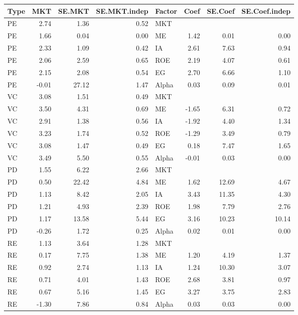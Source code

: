 \documentclass[12pt]{article}
\begin{document}
\begin{table}[ht]
	\centering
	\begin{tabular}{lrrrlrrr}
		\hline
		Type & MKT & SE.MKT & SE.MKT.indep & Factor & Coef & SE.Coef & SE.Coef.indep \\ 
		\hline
		PE & 2.74 & 1.36 & 0.52 & MKT &  &  &  \\ 
		PE & 1.66 & 0.04 & 0.00 & ME & 1.42 & 0.01 & 0.00 \\ 
		PE & 2.33 & 1.09 & 0.42 & IA & 2.61 & 7.63 & 0.94 \\ 
		PE & 2.06 & 2.59 & 0.65 & ROE & 2.19 & 4.07 & 0.61 \\ 
		PE & 2.15 & 2.08 & 0.54 & EG & 2.70 & 6.66 & 1.10 \\ 
		PE & -0.01 & 27.12 & 1.47 & Alpha & 0.03 & 0.09 & 0.01 \\ 
		VC & 3.08 & 1.51 & 0.49 & MKT &  &  &  \\ 
		VC & 3.50 & 4.31 & 0.69 & ME & -1.65 & 6.31 & 0.72 \\ 
		VC & 2.91 & 1.38 & 0.56 & IA & -1.92 & 4.40 & 1.34 \\ 
		VC & 3.23 & 1.74 & 0.52 & ROE & -1.29 & 3.49 & 0.79 \\ 
		VC & 3.08 & 1.47 & 0.49 & EG & 0.18 & 7.47 & 1.65 \\ 
		VC & 3.49 & 5.50 & 0.55 & Alpha & -0.01 & 0.03 & 0.00 \\ 
		PD & 1.55 & 6.22 & 2.66 & MKT &  &  &  \\ 
		PD & 0.50 & 22.42 & 4.84 & ME & 1.62 & 12.69 & 4.67 \\ 
		PD & 1.13 & 8.42 & 2.05 & IA & 3.43 & 11.35 & 4.30 \\ 
		PD & 1.21 & 4.93 & 2.39 & ROE & 1.98 & 7.79 & 2.76 \\ 
		PD & 1.17 & 13.58 & 5.44 & EG & 3.16 & 10.23 & 10.14 \\ 
		PD & -0.26 & 1.72 & 0.25 & Alpha & 0.02 & 0.01 & 0.00 \\ 
		RE & 1.13 & 3.64 & 1.28 & MKT &  &  &  \\ 
		RE & 0.17 & 7.75 & 1.38 & ME & 1.20 & 4.19 & 1.37 \\ 
		RE & 0.92 & 2.74 & 1.13 & IA & 1.24 & 10.30 & 3.07 \\ 
		RE & 0.71 & 4.01 & 1.43 & ROE & 2.68 & 3.81 & 0.97 \\ 
		RE & 0.67 & 5.16 & 1.45 & EG & 3.27 & 3.75 & 2.83 \\ 
		RE & -1.30 & 7.86 & 0.84 & Alpha & 0.03 & 0.03 & 0.00 \\ 

\end{tabular}
\end{table}
\end{document}
